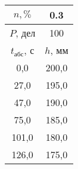 \begin{tabular}[t]{|c|c|}
\hline
$n, \%$ & 0.3 \\
\hline
$P$, дел & 100 \\
\hline
$t_{абс}$, с & $h$, мм \\ 
\hline
0,0 & 200,0 \\ 
27,0 & 195,0 \\ 
47,0 & 190,0 \\ 
75,0 & 185,0 \\ 
101,0 & 180,0 \\ 
126,0 & 175,0 \\ 
\hline
\end{tabular}